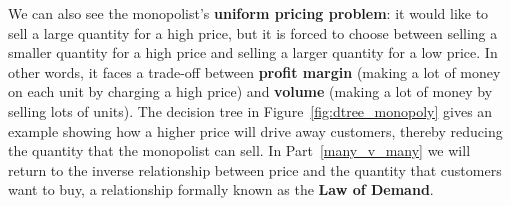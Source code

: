 We can also see the monopolist's \textbf{uniform pricing problem}: it would like to sell a large quantity for a high price, but it is forced to choose between selling a smaller quantity for a high price and selling a larger quantity for a low price. In other words, it faces a trade-off between \textbf{profit margin} (making a lot of money on each unit by charging a high price) and \textbf{volume} (making a lot of money by selling lots of units). The decision tree in Figure~\ref{fig:dtree_monopoly} gives an example showing how a higher price will drive away customers, thereby reducing the quantity that the monopolist can sell. In Part~\ref{many_v_many} we will return to the inverse relationship between price and the quantity that customers want to buy, a relationship formally known as the \textbf{Law of Demand}.




